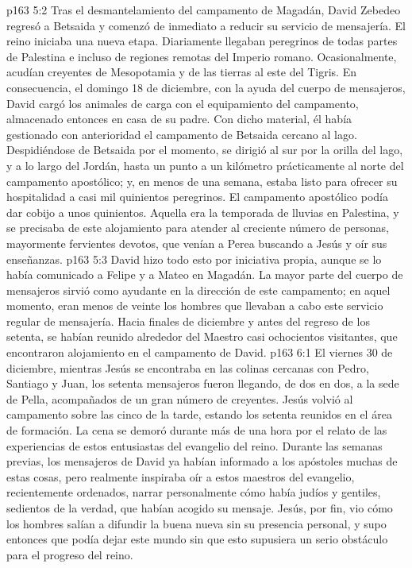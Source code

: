 \vs p163 5:2 Tras el desmantelamiento del campamento de Magadán, David Zebedeo regresó a Betsaida y comenzó de inmediato a reducir su servicio de mensajería. El reino iniciaba una nueva etapa. Diariamente llegaban peregrinos de todas partes de Palestina e incluso de regiones remotas del Imperio romano. Ocasionalmente, acudían creyentes de Mesopotamia y de las tierras al este del Tigris. En consecuencia, el domingo 18 de diciembre, con la ayuda del cuerpo de mensajeros, David cargó los animales de carga con el equipamiento del campamento, almacenado entonces en casa de su padre. Con dicho material, él había gestionado con anterioridad el campamento de Betsaida cercano al lago. Despidiéndose de Betsaida por el momento, se dirigió al sur por la orilla del lago, y a lo largo del Jordán, hasta un punto a un kilómetro prácticamente al norte del campamento apostólico; y, en menos de una semana, estaba listo para ofrecer su hospitalidad a casi mil quinientos peregrinos. El campamento apostólico podía dar cobijo a unos quinientos. Aquella era la temporada de lluvias en Palestina, y se precisaba de este alojamiento para atender al creciente número de personas, mayormente fervientes devotos, que venían a Perea buscando a Jesús y oír sus enseñanzas.
\vs p163 5:3 David hizo todo esto por iniciativa propia, aunque se lo había comunicado a Felipe y a Mateo en Magadán. La mayor parte del cuerpo de mensajeros sirvió como ayudante en la dirección de este campamento; en aquel momento, eran menos de veinte los hombres que llevaban a cabo este servicio regular de mensajería. Hacia finales de diciembre y antes del regreso de los setenta, se habían reunido alrededor del Maestro casi ochocientos visitantes, que encontraron alojamiento en el campamento de David.
\vs p163 6:1 El viernes 30 de diciembre, mientras Jesús se encontraba en las colinas cercanas con Pedro, Santiago y Juan, los setenta mensajeros fueron llegando, de dos en dos, a la sede de Pella, acompañados de un gran número de creyentes. Jesús volvió al campamento sobre las cinco de la tarde, estando los setenta reunidos en el área de formación. La cena se demoró durante más de una hora por el relato de las experiencias de estos entusiastas del evangelio del reino. Durante las semanas previas, los mensajeros de David ya habían informado a los apóstoles muchas de estas cosas, pero realmente inspiraba oír a estos maestros del evangelio, recientemente ordenados, narrar personalmente cómo había judíos y gentiles, sedientos de la verdad, que habían acogido su mensaje. Jesús, por fin, vio cómo los hombres salían a difundir la buena nueva sin su presencia personal, y supo entonces que podía dejar este mundo sin que esto supusiera un serio obstáculo para el progreso del reino.
